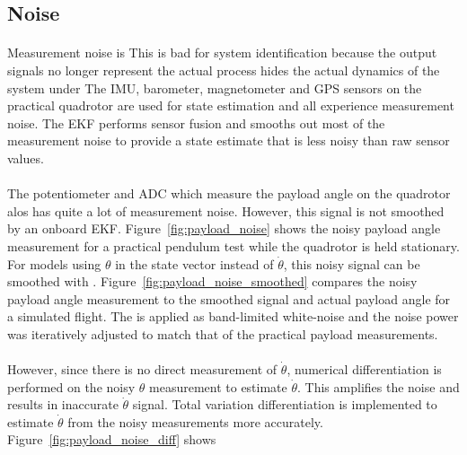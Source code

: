     \subsection{Noise}
        \paragraph{}
        Measurement noise is 
        This is bad for system identification because the output signals no longer represent the actual process
        hides the actual dynamics of the system under  
        The IMU, barometer, magnetometer and GPS sensors on the practical quadrotor are used for state estimation 
        and all experience measurement noise.
        The EKF performs sensor fusion and smooths out most of the measurement noise to provide a state estimate that is less noisy than raw sensor values.
        
        \paragraph{}
        The potentiometer and ADC which measure the payload angle on the quadrotor alos has quite a lot of measurement noise.
        However, this signal is not smoothed by an onboard EKF.
        Figure~\ref{fig:payload_noise} shows the noisy payload angle measurement for a practical pendulum test while the quadrotor is held stationary.
        For models using $\theta$ in the state vector instead of $\dot{\theta}$, 
        this noisy signal can be smoothed with .
        Figure~\ref{fig:payload_noise_smoothed} compares the noisy payload angle measurement to the smoothed signal and actual payload angle for a simulated flight.
        The is applied as band-limited white-noise and the noise power was iteratively adjusted to match that of the practical payload measurements.
        
        
        
        \paragraph{}
        However, since there is no direct measurement of $\dot{\theta}$, 
        numerical differentiation is performed on the noisy $\theta$ measurement to estimate $\dot{\theta}$. 
        This amplifies the noise and results in inaccurate $\dot{\theta}$ signal.
        Total variation differentiation is implemented to estimate $\dot{\theta}$ from the noisy measurements more accurately. \cite{}
        Figure~\ref{fig:payload_noise_diff} shows
        
